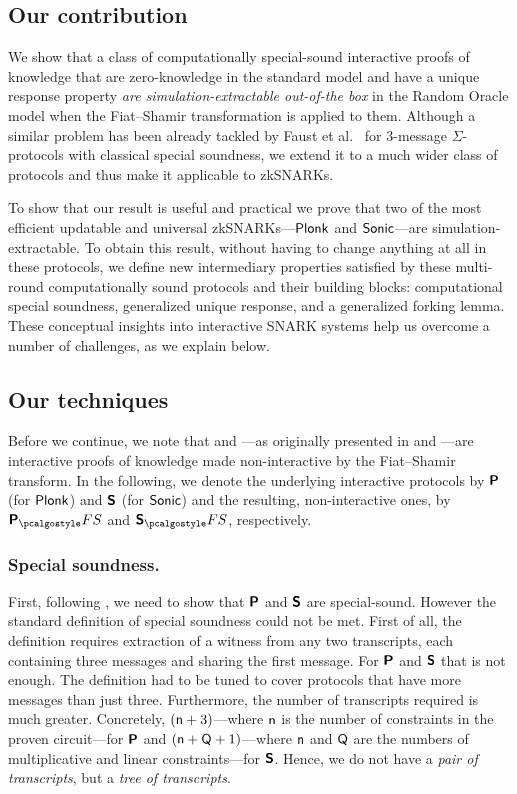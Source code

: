 \documentclass[runningheads,11pt]{llncs}
\theoremstyle{definition} \newtheorem{definition}[theorem]{Definition}
\begin{document}
\subsection{Our contribution}
We show that a class of computationally special-sound interactive proofs of
knowledge that are zero-knowledge 
in the standard model and have a unique response property \emph{are
  simulation-extractable out-of-the box} in the Random Oracle model when the Fiat--Shamir transformation is
applied to them. Although a similar problem has been already tackled by Faust et
al.~\cite{INDOCRYPT:FKMV12} for $3$-message $\Sigma$-protocols with classical special soundness, we extend it to a much wider class of protocols and thus make it applicable to zkSNARKs.

To show that our result is useful and practical we prove that two of the most
efficient updatable and universal zkSNARKs---$\textnormal{\textsf{Plonk}}$ and ${\textnormal{\textsf{Sonic}}}$---are
simulation-extractable. To obtain this result, without having to change anything at all in these protocols, we define new intermediary properties satisfied by these multi-round computationally sound protocols and their building blocks: computational special soundness, generalized unique response, and a generalized forking lemma. These conceptual insights into interactive SNARK systems help us overcome a number of challenges, as we explain below.

\subsection{Our techniques}

Before we continue, we note that \plonk{} and \sonic{}---as originally presented
in \cite{EPRINT:GabWilCio19} and \cite{CCS:MBKM19}---are interactive proofs of
knowledge made non-interactive by the Fiat--Shamir transform. In the following,
we denote the underlying interactive protocols by $\bm{\mathsf{P}}$ (for $\textnormal{\textsf{Plonk}}$)
and $\bm{\mathsf{S}}$ (for ${\textnormal{\textsf{Sonic}}}$) and the resulting, non-interactive ones, by
$\plonkprotfs$ and $\sonicprotfs$, respectively.

\subsubsection{Special soundness.} 
First, following \cite{INDOCRYPT:FKMV12}, we need to show that $\bm{\mathsf{P}}$ and
$\bm{\mathsf{S}}$ are special-sound. However the standard definition of special
soundness could not be met. First of all, the definition requires extraction of
a witness from any two transcripts, each containing three messages and sharing
the first message. For $\bm{\mathsf{P}}$ and $\bm{\mathsf{S}}$ that is not enough. The
definition had to be tuned to cover protocols that have more messages than just
three. Furthermore, the number of transcripts required is much
greater. Concretely, $(\mathsf{n} + 3)$---where $\mathsf{n}$ is the
number of constraints in the proven circuit---for $\bm{\mathsf{P}}$ and $(\mathsf{n}
+ \mathsf{Q} + 1)$---where $\mathsf{n}$ and $\mathsf{Q}$ are the numbers of
multiplicative and linear constraints---for $\bm{\mathsf{S}}$. Hence, we do not have
a \emph{pair of transcripts}, but a \emph{tree of transcripts}.
\end{document}
